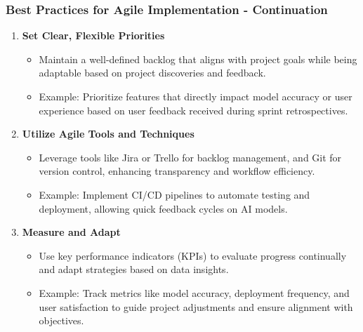 \documentclass{beamer}
\begin{document}
\begin{frame}[fragile]
    \frametitle{Best Practices for Agile Implementation - Continuation}
    \begin{enumerate}[resume]
        \item \textbf{Set Clear, Flexible Priorities}
            \begin{itemize}
                \item Maintain a well-defined backlog that aligns with project goals while being adaptable based on project discoveries and feedback.
                \item Example: Prioritize features that directly impact model accuracy or user experience based on user feedback received during sprint retrospectives.
            \end{itemize}

        \item \textbf{Utilize Agile Tools and Techniques}
            \begin{itemize}
                \item Leverage tools like Jira or Trello for backlog management, and Git for version control, enhancing transparency and workflow efficiency.
                \item Example: Implement CI/CD pipelines to automate testing and deployment, allowing quick feedback cycles on AI models.
            \end{itemize}

        \item \textbf{Measure and Adapt}
            \begin{itemize}
                \item Use key performance indicators (KPIs) to evaluate progress continually and adapt strategies based on data insights.
                \item Example: Track metrics like model accuracy, deployment frequency, and user satisfaction to guide project adjustments and ensure alignment with objectives.
            \end{itemize}
    \end{enumerate}
\end{frame}
\end{document}
